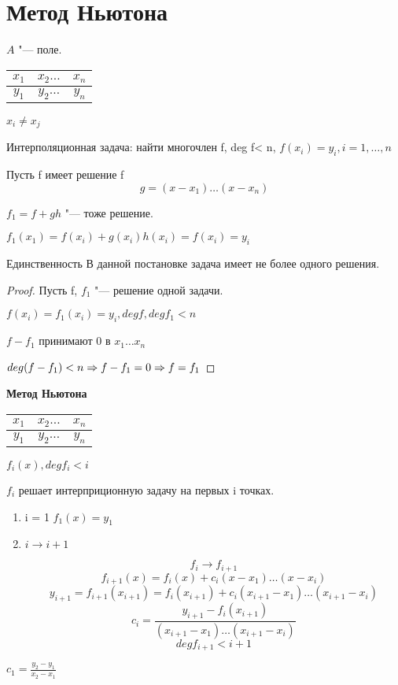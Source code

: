 ﻿\section{Метод Ньютона}
\begin{Def}
$A$ "--- поле.
\begin{tabular}{c|c|c}
$x_1$ & $x_2 \ldots$ & $x_n$\\
\hline
$y_1$ & $y_2 \ldots$ & $y_n$\\
\end{tabular}

$x_i \ne x_j$

Интерполяционная задача: найти многочлен f, deg f< n, $f(x_i) = y_i, i = 1, \ldots, n$

Пусть f имеет решение f
$$g = (x - x_1) \ldots (x - x_n)$$

$f_1 = f + gh$ "--- тоже решение.

$f_1(x_1) = f(x_i) + g(x_i)h(x_i) = f(x_i) = y_i$

\end{Def}

\begin{theorem}{Единственность}
В данной постановке задача имеет не более одного решения. 
\end{theorem}

\begin{proof}
Пусть f, $f_1$ "--- решение одной задачи.

$f(x_i) = f_1(x_i) = y_i, deg f, deg f_1 < n$

$f - f_1$ принимают 0 в $x_1 \ldots x_n$

$deg(f - f_1) < n \Rightarrow f - f_1 = 0 \Rightarrow f = f_1$
\end{proof}

{\bf Метод Ньютона}   
\begin{tabular}{c|c|c}
$x_1$ & $x_2 \ldots$ & $x_n$\\
\hline
$y_1$ & $y_2 \ldots$ & $y_n$\\
\end{tabular}
$f_i(x), deg f_i < i$

$f_i$ решает интерприционную задачу на первых i точках.

\begin{enumerate}
\item i = 1
   $f_1(x) = y_1$
\item $i \to i + 1$

$$f_i \to f_{i + 1}$$
$$f_{i + 1}(x) = f_i(x) + c_i(x - x_1)\ldots(x - x_i)$$
$$y_{i + 1} = f_{i + 1}(x_{i + 1}) = f_i(x_{i + 1}) + c_i(x_{i + 1} - x_1) \ldots (x_{i + 1} - x_i)$$
$$c_i = \frac{y_{i + 1} - f_i(x_{i + 1})}{(x_{i + 1} - x_{1}) \ldots (x_{i + 1} - x_{i})}$$
$$deg f_{i + 1} < i + 1$$

\end{enumerate}



\begin{Rem}
$c_1 = \frac{y_2 - y_1}{x_2 - x_1}$
\end{Rem}

                    
